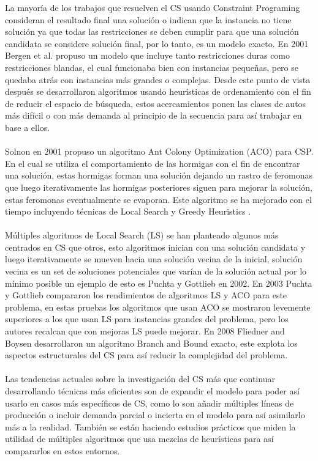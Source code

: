 \documentclass[letter, 10pt]{article}
\begin{document}
La mayor\'ia de los trabajos que resuelven el CS usando Constraint Programing consideran el resultado final una soluci\'on o indican que la instancia no tiene soluci\'on ya que todas las restricciones se deben cumplir para que una soluci\'on candidata se considere soluci\'on final, por lo tanto, es un modelo exacto. En 2001 Bergen et al. \cite{Bergen} propuso un modelo que incluye tanto restricciones duras como restricciones blandas, el cual funcionaba bien con instancias peque\~{n}as, pero
se quedaba atr\'as con instancias m\'as grandes o complejas. Desde este punto de vista despu\'es se desarrollaron algoritmos usando heur\'isticas de ordenamiento con el fin de reducir el espacio de b\'usqueda, estos acercamientos ponen las clases de autos m\'as dif\'icil o con m\'as demanda al principio de la secuencia para as\'i trabajar en base a ellos.\\\\
Solnon en 2001 \cite{Solnon01} propuso un algoritmo Ant Colony Optimization (ACO) para CSP. En el cual se utiliza el comportamiento de las hormigas con el fin de encontrar una soluci\'on, estas hormigas forman una soluci\'on dejando un rastro de feromonas que luego iterativamente las hormigas posteriores siguen para mejorar la soluci\'on, estas feromonas eventualmente se evaporan. Este algoritmo se ha mejorado con el tiempo incluyendo t\'ecnicas de Local Search y Greedy Heuristics \cite{Lin}.\\\\
M\'ultiples algoritmos de Local Search (LS) se han planteado algunos m\'as centrados en CS que otros, esto algoritmos inician con una soluci\'on candidata y luego iterativamente se mueven hacia una soluci\'on vecina de la inicial, soluci\'on vecina es un set de soluciones potenciales que var\'ian de la soluci\'on actual por lo m\'inimo posible un ejemplo de esto es Puchta y Gottlieb \cite{Puchta02} en 2002. En 2003 Puchta y Gottlieb \cite{Puchta03} compararon los rendimientos de algoritmos LS y ACO para este problema, en estas pruebas los algoritmos que usan ACO se mostraron levemente superiores a los que usan LS para instancias grandes del problema, pero los autores recalcan que con mejoras LS puede mejorar. En 2008 Fliedner and Boysen \cite{Fli} desarrollaron un algoritmo Branch and Bound exacto, este explota los aspectos estructurales del CS para as\'i reducir la complejidad del problema.
\\\\
Las tendencias actuales sobre la investigaci\'on del CS m\'as que continuar desarrollando t\'ecnicas m\'as eficientes son de expandir el modelo para poder as\'i usarlo en casos m\'as espec\'ificos de CS, como lo son a\~{n}adir m\'ultiples l\'ineas de producci\'on o incluir demanda parcial o incierta en el modelo para as\'i asimilarlo m\'as a la realidad. Tambi\'en se est\'an haciendo estudios pr\'acticos que miden la utilidad de m\'ultiples algoritmos que usa mezclas de heur\'isticas para as\'i compararlos en estos entornos.
\end{document}
